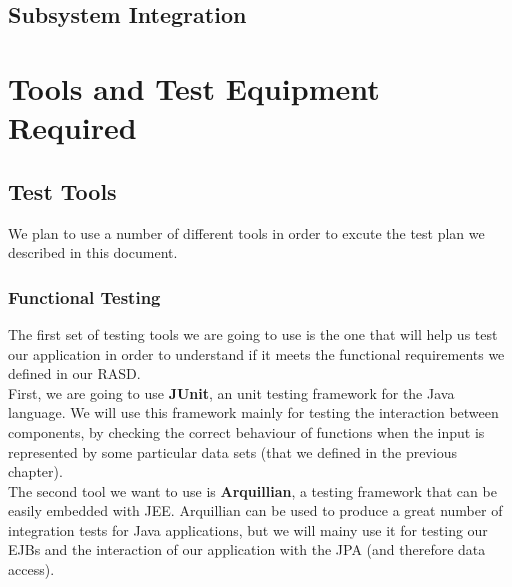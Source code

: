 \documentclass{article}
\begin{document}
\subsection{Subsystem Integration}

\newpage

\section{Tools and Test Equipment Required}
\subsection{Test Tools}
We plan to use a number of different tools in order to excute the test plan we described in this document.
\subsubsection{Functional Testing}
The first set of testing tools we are going to use is the one that will help us test our application in order to understand  if it meets the functional requirements we defined in our RASD.
\\

First, we are going to use \textbf{JUnit}, an unit testing framework for the Java language. We will use this framework mainly for testing the interaction between components, by checking the correct behaviour of functions when the input is represented by some particular data sets (that we defined in the previous chapter).
\\

The second tool we want to use is \textbf{Arquillian}, a testing framework that can be easily embedded with JEE. Arquillian can be used to produce a great number of integration tests for Java applications, but we will mainy use it for testing our EJBs and the interaction of our application with the JPA (and therefore data access).
\end{document}

